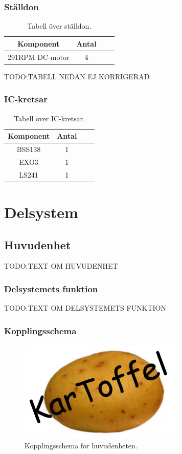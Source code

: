 \documentclass{article}
\begin{document}
\subsubsection{Ställdon}
\begin{table}[H]
  \centering
  \begin{tabular}{ | c | c | c | c |}
    \hline
    \textbf{Komponent} & \textbf{Antal} \\
    \hline
    291RPM DC-motor & 4 \\
    \hline
  \end{tabular}
  \caption{ Tabell över ställdon. }
\end{table}

TODO:TABELL NEDAN EJ KORRIGERAD
\subsubsection{IC-kretsar}
\begin{table}[H]
  \centering
  \begin{tabular}{ | c | c | c | c |}
    \hline
    \textbf{Komponent} & \textbf{Antal} \\
    \hline
    BSS138 & 1 \\
   \hline
    EXO3 & 1 \\
    \hline
    LS241 & 1 \\
    \hline
  \end{tabular}
  \caption{ Tabell över IC-kretsar. }
\end{table}

\clearpage
\section{Delsystem}

\subsection{Huvudenhet}
TODO:TEXT OM HUVUDENHET

\subsubsection{Delsystemets funktion}
TODO:TEXT OM DELSYSTEMETS FUNKTION

\subsubsection{Kopplingsschema}
\begin{figure}[H]
\centering
\includegraphics[scale=0.45]{Logo}
\caption{Kopplingsschema för huvudenheten.}
\label{fig:huvudenhet_kopplingsschema}
\end{figure}
\end{document}
